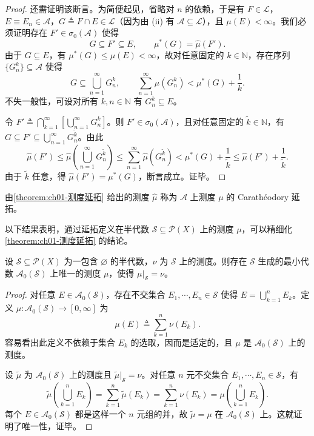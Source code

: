 \documentclass[../../main.tex]{subfiles}%
\begin{document}
\begin{proof}
还需证明该断言。为简便起见，省略对 $n$ 的依赖，于是有 $F\in\mathcal{L}$，$E\equiv E_n\in\mathcal{A}$，$G\triangleq F\cap E\in\mathcal{L}$（因为由 (ii) 有 $\mathcal{A}\subseteq\mathcal{L}$），且 $\mu(E)<\infty$。我们必须证明存在 $F'\in\sigma_0(\mathcal{A})$ 使得
\[
G\subseteq F'\subseteq E,\qquad\mu^*(G)=\widehat{\mu}(F').
\]
由于 $G\subseteq E$，有 $\mu^*(G)\leqslant\mu(E)<\infty$，故对任意固定的 $k\in\mathbb{N}$，存在序列 $\{G_n^k\}\subseteq\mathcal{A}$ 使得
\[
G\subseteq\bigcup_{n=1}^\infty G_n^k,\qquad
\sum_{n=1}^\infty\mu(G_n^k)<\mu^*(G)+\frac{1}{k}.
\]
不失一般性，可设对所有 $k,n\in\mathbb{N}$ 有 $G_n^k\subseteq E$。

令 $F'\triangleq \bigcap_{k=1}^\infty\left[\bigcup_{n=1}^\infty G_n^k\right]$。则 $F'\in\sigma_0(\mathcal{A})$，且对任意固定的 $\widetilde{k}\in\mathbb{N}$，有 $G\subseteq F'\subseteq\bigcup_{n=1}^\infty G_n^{\widetilde{k}}$。由此
\[
\widehat{\mu}(F')\leqslant\widehat{\mu}\left(\bigcup_{n=1}^\infty G_n^{\widetilde{k}}\right)
\leqslant\sum_{n=1}^\infty\widehat{\mu}(G_n^{\widetilde{k}})
<\mu^*(G)+\frac{1}{\widetilde{k}}
\leqslant\widehat{\mu}(F')+\frac{1}{\widetilde{k}}.
\]
由于 $\widetilde{k}$ 任意，得 $\widehat{\mu}(F')=\mu^*(G)$，断言成立。证毕。
\end{proof}

\begin{definition}\label{definition:ch01-Caratheodory延拓}
由\cref{theorem:ch01-测度延拓} 给出的测度 $\widehat{\mu}$ 称为 $\mathcal{A}$ 上测度 $\mu$ 的 Carathéodory 延拓。
\end{definition}

以下结果表明，通过延拓定义在半代数 $\mathcal{S}\subseteq\mathcal{P}(X)$ 上的测度 $\mu$，可以精细化\cref{theorem:ch01-测度延拓} 的结论。

\begin{proposition}\label{proposition:ch01-半代数延拓}
设 $\mathcal{S}\subseteq\mathcal{P}(X)$ 为一包含 $\varnothing $ 的半代数，$\nu$ 为 $\mathcal{S}$ 上的测度。则存在 $\mathcal{S}$ 生成的最小代数 $\mathcal{A}_0(\mathcal{S})$ 上唯一的测度 $\mu$，使得 $\mu|_{\mathcal{S}}=\nu$。
\end{proposition}

\begin{proof}
对任意 $E\in\mathcal{A}_0(\mathcal{S})$，存在不交集合 $E_1,\cdots ,E_n\in\mathcal{S}$ 使得 $E=\bigcup_{k=1}^n E_k$。定义 $\mu:\mathcal{A}_0(\mathcal{S})\to[0,\infty]$ 为
\[
\mu(E)\triangleq \sum_{k=1}^n\nu(E_k).
\]
容易看出此定义不依赖于集合 $E_k$ 的选取，因而是适定的，且 $\mu$ 是 $\mathcal{A}_0(\mathcal{S})$ 上的测度。

设 $\widetilde{\mu}$ 为 $\mathcal{A}_0(\mathcal{S})$ 上的测度且 $\widetilde{\mu}|_{\mathcal{S}}=\nu$。对任意 $n$ 元不交集合 $E_1,\cdots ,E_n\in\mathcal{S}$，有
\[
\widetilde{\mu}\left(\bigcup_{k=1}^n E_k\right)=\sum_{k=1}^n\widetilde{\mu}(E_k)=\sum_{k=1}^n\nu(E_k)=\mu\left(\bigcup_{k=1}^n E_k\right).
\]
每个 $E\in\mathcal{A}_0(\mathcal{S})$ 都是这样一个 $n$ 元组的并，故 $\widetilde{\mu}=\mu$ 在 $\mathcal{A}_0(\mathcal{S})$ 上。这就证明了唯一性，证毕。
\end{proof}
\end{document}
